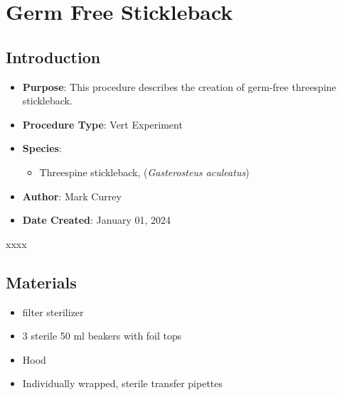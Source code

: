 \documentclass[
  letterpaper,
  DIV=11,
  numbers=noendperiod]{scrreprt}
\providecommand{\tightlist}{%
  \setlength{\itemsep}{0pt}\setlength{\parskip}{0pt}}\usepackage{longtable,booktabs,array}
\begin{document}
\hypertarget{sec-vert_exp-gremfree_SB}{%
\chapter{Germ Free Stickleback}\label{sec-vert_exp-gremfree_SB}}

\hypertarget{introduction-76}{%
\section{Introduction}\label{introduction-76}}

\begin{itemize}
\tightlist
\item
  \textbf{Purpose}: This procedure describes the creation of germ-free
  threespine stickleback.
\item
  \textbf{Procedure Type}: Vert Experiment
\item
  \textbf{Species}:

  \begin{itemize}
  \tightlist
  \item
    Threespine stickleback, (\emph{Gasterosteus aculeatus})
  \end{itemize}
\item
  \textbf{Author}: Mark Currey
\item
  \textbf{Date Created}: January 01, 2024
\end{itemize}

\begin{tcolorbox}[enhanced jigsaw, rightrule=.15mm, title=\textcolor{quarto-callout-warning-color}{\faExclamationTriangle}\hspace{0.5em}{NOTES}, titlerule=0mm, opacitybacktitle=0.6, toprule=.15mm, bottomrule=.15mm, opacityback=0, left=2mm, colframe=quarto-callout-warning-color-frame, breakable, coltitle=black, colback=white, colbacktitle=quarto-callout-warning-color!10!white, bottomtitle=1mm, leftrule=.75mm, toptitle=1mm, arc=.35mm]

xxxx

\end{tcolorbox}

\hypertarget{materials-72}{%
\section{Materials}\label{materials-72}}

\begin{itemize}
\tightlist
\item
  filter sterilizer
\item
  3 sterile 50 ml beakers with foil tops
\item
  Hood
\item
  Individually wrapped, sterile transfer pipettes
\end{itemize}
\end{document}
